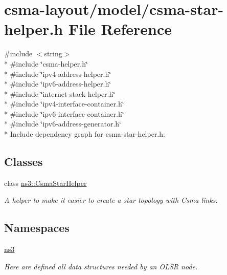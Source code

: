 \hypertarget{csma-star-helper_8h}{}\section{csma-\/layout/model/csma-\/star-\/helper.h File Reference}
\label{csma-star-helper_8h}
{\ttfamily \#include $<$string$>$}\\*
{\ttfamily \#include \char`\"{}csma-\/helper.\+h\char`\"{}}\\*
{\ttfamily \#include \char`\"{}ipv4-\/address-\/helper.\+h\char`\"{}}\\*
{\ttfamily \#include \char`\"{}ipv6-\/address-\/helper.\+h\char`\"{}}\\*
{\ttfamily \#include \char`\"{}internet-\/stack-\/helper.\+h\char`\"{}}\\*
{\ttfamily \#include \char`\"{}ipv4-\/interface-\/container.\+h\char`\"{}}\\*
{\ttfamily \#include \char`\"{}ipv6-\/interface-\/container.\+h\char`\"{}}\\*
{\ttfamily \#include \char`\"{}ipv6-\/address-\/generator.\+h\char`\"{}}\\*
Include dependency graph for csma-\/star-\/helper.h\+:
\subsection*{Classes}
\begin{DoxyCompactItemize}
\item 
class \hyperlink{classns3_1_1CsmaStarHelper}{ns3\+::\+Csma\+Star\+Helper}
\begin{DoxyCompactList}\small\item\em A helper to make it easier to create a star topology with Csma links. \end{DoxyCompactList}\end{DoxyCompactItemize}
\subsection*{Namespaces}
\begin{DoxyCompactItemize}
\item 
 \hyperlink{namespacens3}{ns3}
\begin{DoxyCompactList}\small\item\em Here are defined all data structures needed by an O\+L\+SR node. \end{DoxyCompactList}\end{DoxyCompactItemize}
